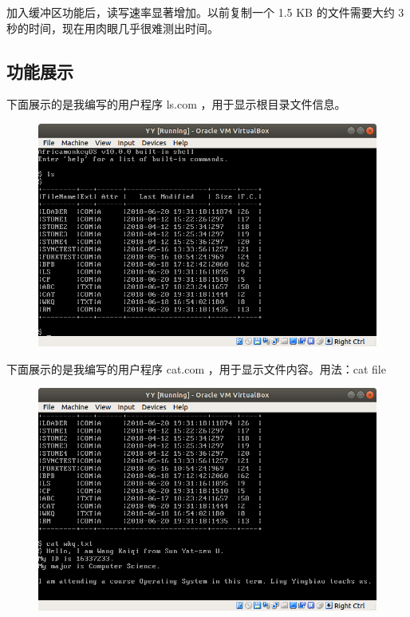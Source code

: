 \documentclass[a4paper]{article}
\begin{document}
加入缓冲区功能后，读写速率显著增加。以前复制一个 1.5 KB 的文件需要大约 3 秒的时间，现在用肉眼几乎很难测出时间。

\newpage

\subsection{功能展示}

下面展示的是我编写的用户程序 ls.com ，用于显示根目录文件信息。

\begin{figure}[!hbp]
\centering
\includegraphics[scale=0.5]{pics/3.png}
\end{figure}

下面展示的是我编写的用户程序 cat.com ，用于显示文件内容。用法：cat file

\begin{figure}[!hbp]
\centering
\includegraphics[scale=0.5]{pics/4.png}
\end{figure}
\end{document}
